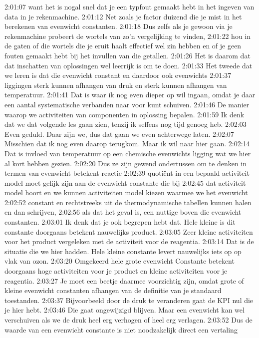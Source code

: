 2:01:07
want het is nogal snel dat je een typfout gemaakt hebt in het ingeven van data in je rekenmachine.
2:01:12
Net zoals je factor duizend die je mist in het berekenen van evenwicht constanten.
2:01:18
Dus zelfs als je gewoon via je rekenmachine probeert de wortels van zo'n vergelijking te vinden,
2:01:22
hou in de gaten of die wortels die je eruit haalt effectief wel zin hebben en of je geen fouten gemaakt hebt bij het invullen van die getallen.
2:01:26
Het is daarom dat dat inschatten van oplossingen wel leerrijk is om te doen.
2:01:33
Het tweede dat we leren is dat die evenwicht constant en daardoor ook evenwichts
2:01:37
liggingen sterk kunnen afhangen van druk en sterk kunnen afhangen van temperatuur.
2:01:41
Dat is waar ik nog even dieper op wil ingaan, omdat je daar een aantal systematische verbanden naar voor kunt schuiven.
2:01:46
De manier waarop we activiteiten van componenten in oplossing bepalen.
2:01:59
Ik denk dat we dat volgende les gaan zien, tenzij ik seffens nog tijd genoeg heb.
2:02:03
Even geduld. Daar zijn we, dus dat gaan we even achterwege laten.
2:02:07
Misschien dat ik nog even daarop terugkom. Maar ik wil naar hier gaan.
2:02:14
Dat is invloed van temperatuur op een chemische evenwichts ligging wat we hier al kort hebben gezien.
2:02:20
Dus ze zijn gewend ondertussen om te denken in termen van evenwicht betekent reactie
2:02:39
quotiënt in een bepaald activiteit model moet gelijk zijn aan de evenwicht constante die bij
2:02:45
dat activiteit model hoort en we kunnen activiteiten model kiezen waarmee we het evenwicht
2:02:52
constant en rechtstreeks uit de thermodynamische tabellen kunnen halen en dan schrijven,
2:02:56
als dat het geval is, een nuttige boven die evenwicht constanten.
2:03:01
Ik denk dat je ook begrepen hebt dat. Hele kleine is dit constante doorgaans betekent nauwelijks product.
2:03:05
Zeer kleine activiteiten voor het product vergeleken met de activiteit voor de reagentia.
2:03:14
Dat is de situatie die we hier hadden. Hele kleine constante levert nauwelijks iets op op vlak van ozon.
2:03:20
Omgekeerd hele grote evenwicht Constante betekent doorgaans hoge activiteiten voor je product en kleine activiteiten voor je reagentia.
2:03:27
Je moet een beetje daarmee voorzichtig zijn, omdat grote of kleine evenwicht constanten afhangen van de definitie van je standaard toestanden.
2:03:37
Bijvoorbeeld door de druk te veranderen gaat de KPI nul die je hier hebt.
2:03:46
Die gaat ongewijzigd blijven. Maar een evenwicht kan wel verschuiven als we de druk heel erg verhogen of heel erg verlagen.
2:03:52
Dus de waarde van een evenwicht constante is niet noodzakelijk direct een vertaling
